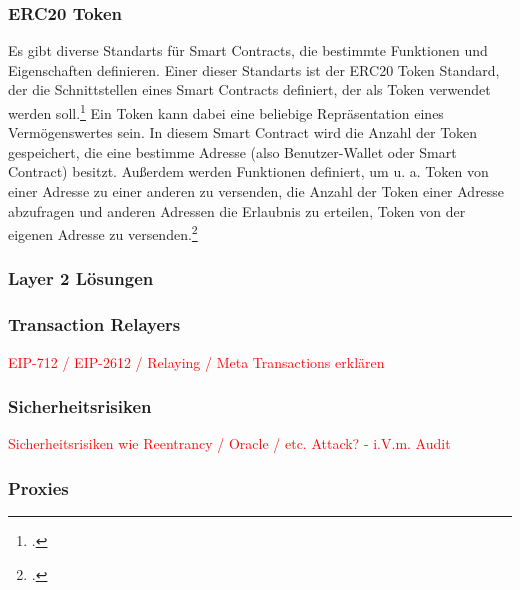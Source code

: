 \subsubsection{ERC20 Token}
\label{sec:definition-erc20-token}
Es gibt diverse Standarts für Smart Contracts, die bestimmte Funktionen und Eigenschaften definieren.
Einer dieser Standarts ist der ERC20 Token Standard, der die Schnittstellen eines Smart Contracts definiert, der als Token verwendet werden soll.\footcite[Vgl. hierzu und im Folgenden][]{w7}
Ein Token kann dabei eine beliebige Repräsentation eines Vermögenswertes sein.
In diesem Smart Contract wird die Anzahl der Token gespeichert, die eine bestimme Adresse (also Benutzer-Wallet oder Smart Contract) besitzt.
Außerdem werden Funktionen definiert, um u. a. Token von einer Adresse zu einer anderen zu versenden, die Anzahl der Token einer Adresse abzufragen und anderen Adressen die Erlaubnis zu erteilen, Token von der eigenen Adresse zu versenden.\footcites[Vgl.][]{w8}[]{w7}

\subsubsection{Layer 2 Lösungen}
\label{sec:definition-layer-2-solutions}

\subsubsection{Transaction Relayers}
\label{sec:definition-transaction-relayers}
\textcolor{red}{EIP-712 / EIP-2612 / Relaying / Meta Transactions erklären}

\subsubsection{Sicherheitsrisiken}
\label{sec:definition-sicherheitsrisiken}
\textcolor{red}{Sicherheitsrisiken wie Reentrancy / Oracle / etc. Attack? - i.V.m. Audit }


\subsubsection{Proxies}
\label{sec:definition-proxies}